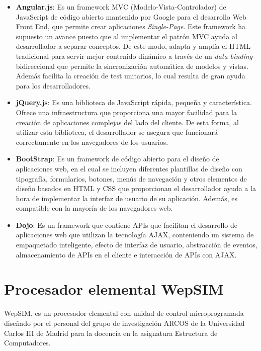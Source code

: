 \begin{itemize}

\item \textbf{Angular.js}: Es un framework MVC (Modelo-Vista-Controlador) de JavaScript de código abierto mantenido por Google para el desarrollo Web Front End, que permite crear aplicaciones \textit{Single-Page}. Este framework ha supuesto un avance puesto que al implementar el patrón MVC ayuda al desarrollador a separar conceptos. De este modo, adapta y amplía el HTML tradicional para servir mejor contenido dinámico a través de un \textit{data binding} bidireccional que permite la sincronización automática de modelos y vistas. Además facilita la creación de test unitarios, lo cual resulta de gran ayuda para los desarrolladores.

\item \textbf{jQuery.js}: Es una biblioteca de JavaScript rápida, pequeña y característica. Ofrece una infraestructura que proporciona una mayor facilidad para la creación de aplicaciones complejas del lado del cliente. De esta forma, al utilizar esta biblioteca, el desarrollador se asegura que funcionará correctamente en los navegadores de los usuarios.

\item \textbf{BootStrap}: Es un framework de código abierto para el diseño de aplicaciones web, en el cual se incluyen diferentes plantillas de diseño con tipografía, formularios, botones, menús de navegación y otros elementos de diseño basados en HTML y CSS que proporcionan el desarrollador ayuda a la hora de implementar la interfaz de usuario de su aplicación. Además, es compatible con la mayoría de los navegadores web.

\item \textbf{Dojo}: Es un framework que contiene APIs que facilitan el desarrollo de aplicaciones web que utilizan la tecnología AJAX, conteniendo un sistema de empaquetado inteligente, efecto de interfaz de usuario, abstracción de eventos, almacenamiento de APIs en el cliente e interacción de APIs con AJAX.

\end{itemize}

\section{Procesador elemental WepSIM}

WepSIM, es un procesador elemental con unidad de control microprogramada diseñado por el personal del grupo de investigación ARCOS de la Universidad Carlos III de Madrid para la docencia en la asignatura Estructura de Computadores.

